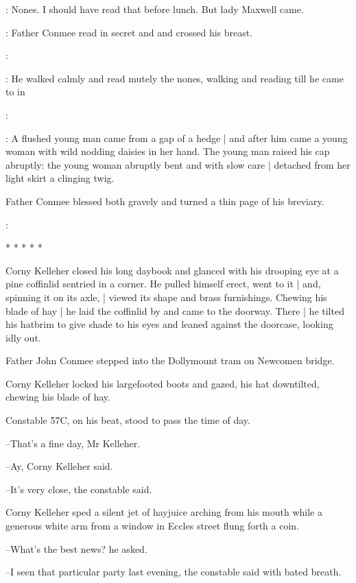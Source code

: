 \conmeeint:
Nones.
I should have read that before lunch.
But lady Maxwell came.

:
Father Conmee read in secret  and 
and crossed his breast.

\conmeeint:

:
He walked calmly and read mutely the nones,
walking and reading till
he came to
 in

\conmeeint:

:
A flushed young man came from a gap of a hedge |
and after him came a young woman
with wild nodding daisies in her hand.
The young man raised his cap abruptly:
the young woman abruptly bent
and with slow care |
detached from her light skirt a clinging twig.

Father Conmee blessed both gravely
and turned a thin page of his breviary.

\conmeeint:


    * * * * *


Corny Kelleher closed his long daybook
and glanced with his drooping eye
at a pine coffinlid sentried in a corner.
He pulled himself erect, went to it |
and, spinning it on its axle, |
viewed its shape and brass furnishings.
Chewing his blade of hay |
he laid the coffinlid by and came to the doorway.
There |
he tilted his hatbrim to give shade to his eyes
and leaned against the doorcase,
looking idly out.

Father John Conmee stepped into the Dollymount tram on Newcomen bridge.

Corny Kelleher locked his largefooted boots and gazed,
his hat downtilted,
chewing his blade of hay.

Constable 57C,
on his beat,
stood to pass the time of day.

--That's a fine day, Mr Kelleher.

--Ay, Corny Kelleher said.

--It's very close,
the constable said.

Corny Kelleher sped a silent jet of hayjuice arching from his mouth
while a generous white arm from a window in Eccles street
flung forth a coin.

--What's the best news? he asked.

--I seen that particular party last evening,
the constable said with bated breath.


